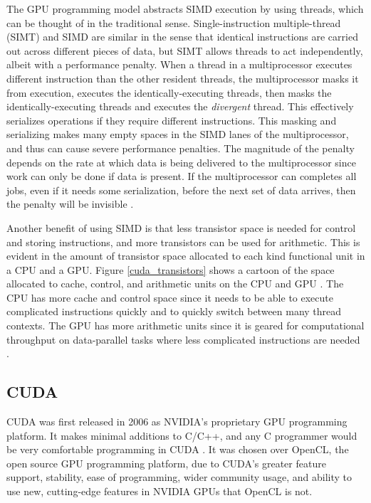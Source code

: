 The GPU programming model abstracts SIMD execution by using threads, which can be thought of in the traditional sense. Single-instruction multiple-thread (SIMT) and SIMD are similar in the sense that identical instructions are carried out across different pieces of data, but SIMT allows threads to act independently, albeit with a performance penalty.   When a thread in a multiprocessor executes different instruction than the other resident threads, the multiprocessor masks it from execution, executes the identically-executing threads, then masks the identically-executing threads and executes the \emph{divergent} thread.  This effectively serializes operations if they require different instructions.  This masking and serializing makes many empty spaces in the SIMD lanes of the multiprocessor, and thus can cause severe performance penalties.  The magnitude of the penalty depends on the rate at which data is being delivered to the multiprocessor since work can only be done if data is present.  If the multiprocessor can completes all jobs, even if it needs some serialization, before the next set of data arrives, then the penalty will be invisible \cite{cuda}.

Another benefit of using SIMD is that less transistor space is needed for control and storing instructions, and more transistors can be used for arithmetic.  This is evident in the amount of transistor space allocated to each kind functional unit in a CPU and a GPU.  Figure \ref{cuda_transistors} shows a cartoon of the space allocated to cache, control, and arithmetic units on the CPU and GPU \cite{cuda}.  The CPU has more cache and control space since it needs to be able to execute complicated instructions quickly and to quickly switch between many thread contexts.  The GPU has more arithmetic units since it is geared for computational throughput on data-parallel tasks where less complicated instructions are needed \cite{cuda}.

\subsection{CUDA}

CUDA was first released in 2006 as NVIDIA's proprietary GPU programming platform.  It makes minimal additions to C/C++, and any C programmer would be very comfortable programming in CUDA \cite{cuda}.  It was chosen over OpenCL, the open source GPU programming platform, due to CUDA's greater feature support, stability, ease of programming, wider community usage, and ability to use new, cutting-edge features in NVIDIA GPUs that OpenCL is not.

